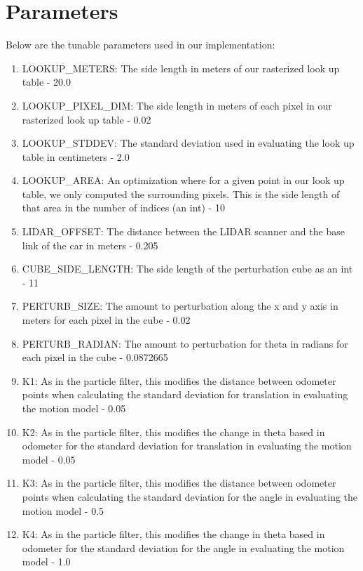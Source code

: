 \documentclass[12pt]{article}
\begin{document}
\maketitle


\section{Parameters}
Below are the tunable parameters used in our implementation:

\begin{enumerate}
	\item LOOKUP\_METERS: The side length in meters of our rasterized look up table - 20.0
	\item LOOKUP\_PIXEL\_DIM: The side length in meters of each pixel in our rasterized look up table - 0.02
	\item LOOKUP\_STDDEV: The standard deviation used in evaluating the look up table in centimeters - 2.0
	\item LOOKUP\_AREA: An optimization where for a given point in our look up table, we only computed the surrounding pixels. This is the side length of that area in the number of indices (an int) - 10
	\item LIDAR\_OFFSET: The distance between the LIDAR scanner and the base link of the car in meters - 0.205
	\item CUBE\_SIDE\_LENGTH: The side length of the perturbation cube as an int - 11
	\item PERTURB\_SIZE: The amount to perturbation along the x and y axis in meters for each pixel in the cube - 0.02	
	\item PERTURB\_RADIAN: The amount to perturbation for theta in radians for each pixel in the cube - 0.0872665
	\item K1: As in the particle filter, this modifies the distance between odometer points when calculating the standard deviation for translation in evaluating the motion model - 0.05
	\item K2: As in the particle filter, this modifies the change in theta based in odometer for the standard deviation for translation in evaluating the motion model - 0.05
	\item K3: As in the particle filter, this modifies the distance between odometer points when calculating the standard deviation for the angle in evaluating the motion model - 0.5
	\item K4: As in the particle filter, this modifies the change in theta based in odometer for the standard deviation for the angle in evaluating the motion model - 1.0
\end{enumerate}
\end{document}
